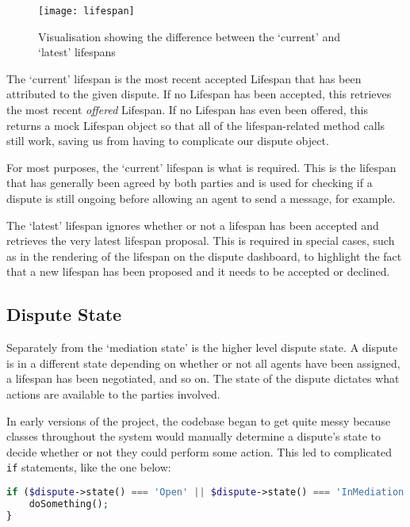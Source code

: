 \begin{figure}[h!]
  \centering
    \ifimages
    \texttt{[image: lifespan]}
    \fi
  \caption{Visualisation showing the difference between the `current' and `latest' lifespans}
  \label{uml:lifespan}
\end{figure}

The `current' lifespan is the most recent accepted Lifespan that has been attributed to the given dispute. If no Lifespan has been accepted, this retrieves the most recent \emph{offered} Lifespan. If no Lifespan has even been offered, this returns a mock Lifespan object so that all of the lifespan-related method calls still work, saving us from having to complicate our dispute object.

For most purposes, the `current' lifespan is what is required. This is the lifespan that has generally been agreed by both parties and is used for checking if a dispute is still ongoing before allowing an agent to send a message, for example.

The `latest' lifespan ignores whether or not a lifespan has been accepted and retrieves the very latest lifespan proposal. This is required in special cases, such as in the rendering of the lifespan on the dispute dashboard, to highlight the fact that a new lifespan has been proposed and it needs to be accepted or declined.

\subsection{Dispute State}

Separately from the `mediation state' is the higher level dispute state. A dispute is in a different state depending on whether or not all agents have been assigned, a lifespan has been negotiated, and so on. The state of the dispute dictates what actions are available to the parties involved.

In early versions of the project, the codebase began to get quite messy because classes throughout the system would manually determine a dispute's state to decide whether or not they could perform some action. This led to complicated \lstinline{if} statements, like the one below:

\begin{lstlisting}[language=php]
if ($dispute->state() === 'Open' || $dispute->state() === 'InMediation' || $dispute->state() === 'NegotiatingLifespan') {
    doSomething();
}
\end{lstlisting}

